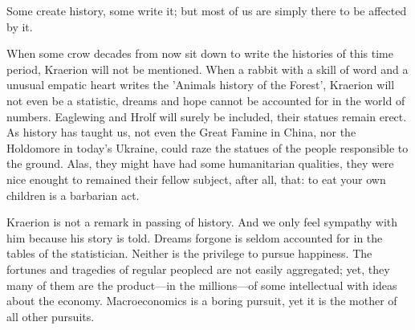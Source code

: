 Some create history, some write it; but most of us are simply there to be affected by it.

When some crow decades from now sit down to write the histories of this time period, Kraerion will not be mentioned. When a rabbit with a skill of word and a unusual empatic heart writes the 'Animals history of the Forest', Kraerion will not even be a statistic, dreams and hope cannot be accounted for in the world of numbers. Eaglewing and Hrolf will surely be included, their statues remain erect. As history has taught us, not even the Great Famine in China, nor the Holdomore in today's Ukraine, could raze the statues of the people responsible to the ground. Alas, they might have had some humanitarian qualities, they were nice enought to remained their fellow subject, after all, that: to eat your own children is a barbarian act.

Kraerion is not a remark in passing of history. And we only feel sympathy with him because his story is told. Dreams forgone is seldom accounted for in the tables of the statistician. Neither is the privilege to pursue happiness. The fortunes and tragedies of regular peoplecd are not easily aggregated;  yet, they many of them are the product---in the millions---of some intellectual with ideas about the economy. Macroeconomics is a boring pursuit, yet it is the mother of all other pursuits.




